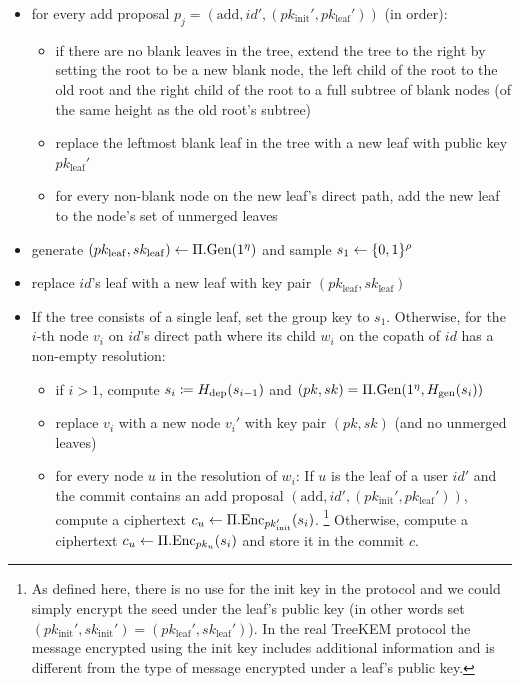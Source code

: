 \begin{definition}
\begin{itemize}
\begin{itemize}
\begin{itemize}
			            \end{itemize}
			      \item for every add proposal $p_j = (\mathrm{add}, id', (pk_{\mathrm{init}}', pk_{\mathrm{leaf}}'))$ (in order):
			            \begin{itemize}
				            \item if there are no blank leaves in the tree, extend the tree to the right by setting the root to be a new blank node, the left child of the root to the old root and the right child of the root to a full subtree of blank nodes (of the same height as the old root's subtree)
				            \item replace the leftmost blank leaf in the tree with a new leaf with public key $pk_{\mathrm{leaf}}'$
				            \item for every non-blank node on the new leaf's direct path, add the new leaf to the node's set of unmerged leaves
			            \end{itemize}
			      \item generate $(pk_{\mathrm{leaf}}, sk_{\mathrm{leaf}}) \leftarrow \Pi.\mathrm{Gen}(1^\eta)$ and sample $s_1 \leftarrow \{0, 1\}^\rho$
			      \item replace $id$'s leaf with a new leaf with key pair $(pk_{\mathrm{leaf}}, sk_{\mathrm{leaf}})$
			      \item If the tree consists of a single leaf, set the group key to $s_1$. Otherwise, for the $i$-th node $v_i$ on $id$'s direct path where its child $w_i$ on the copath of $id$ has a non-empty resolution:
			            \begin{itemize}
				            \item if $i > 1$, compute $s_i \coloneqq H_\mathrm{dep}(s_{i - 1})$ and $(pk, sk) = \Pi.\mathrm{Gen}(1^\eta, H_\mathrm{gen}(s_i))$
				            \item replace $v_i$ with a new node $v_i'$ with key pair $(pk, sk)$ (and no unmerged leaves)
				            \item for every node $u$ in the resolution of $w_i$: If $u$ is the leaf of a user $id'$ and the commit contains an add proposal $(\mathrm{add}, id', (pk_{\mathrm{init}}', pk_{\mathrm{leaf}}'))$, compute a ciphertext $c_u \leftarrow \Pi.\mathrm{Enc}_{pk_{\mathrm{init}}'}(s_i)$. \footnote{As defined here, there is no use for the init key in the protocol and we could simply encrypt the seed under the leaf's public key (in other words set $(pk_{\mathrm{init}}', sk_{\mathrm{init}}') = (pk_{\mathrm{leaf}}', sk_{\mathrm{leaf}}')$). In the real TreeKEM protocol the message encrypted using the init key includes additional information and is different from the type of message encrypted under a leaf's public key.} Otherwise, compute a ciphertext $c_u \leftarrow \Pi.\mathrm{Enc}_{pk_u}(s_i)$ and store it in the commit $c$.

\end{itemize}
\end{itemize}
\end{itemize}
\end{definition}
